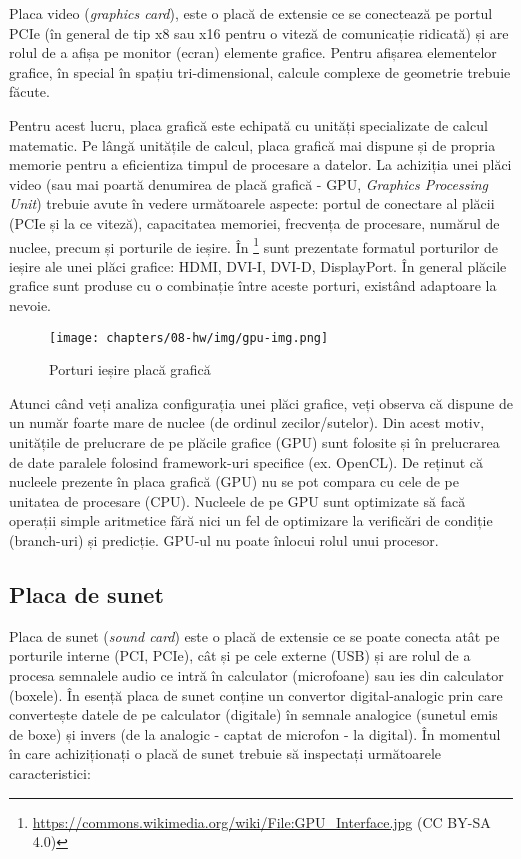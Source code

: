 Placa video (\textit{graphics card}), este o placă de extensie ce se conectează pe portul PCIe (în general de tip x8 sau x16 pentru o viteză de comunicație ridicată) și are rolul de a afișa pe monitor (ecran) elemente grafice.
Pentru afișarea elementelor grafice, în special în spațiu tri-dimensional, calcule complexe de geometrie trebuie făcute.

Pentru acest lucru, placa grafică este echipată cu unități specializate de calcul matematic.
Pe lângă unitățile de calcul, placa grafică mai dispune și de propria memorie pentru a eficientiza timpul de procesare a datelor.
La achiziția unei plăci video (sau mai poartă denumirea de placă grafică - GPU, \textit{Graphics Processing Unit}) trebuie avute în vedere următoarele aspecte: portul de conectare al plăcii (PCIe și la ce viteză), capacitatea memoriei, frecvența de procesare, numărul de nuclee, precum și porturile de ieșire.
În \footnote{\url{https://commons.wikimedia.org/wiki/File:GPU_Interface.jpg} (CC BY-SA 4.0)} sunt prezentate formatul porturilor de ieșire ale unei plăci grafice: HDMI, DVI-I, DVI-D, DisplayPort.
În general plăcile grafice sunt produse cu o combinație între aceste porturi, existând adaptoare la nevoie.

\begin{figure}[!htbp]
  \centering
  \texttt{[image: chapters/08-hw/img/gpu-img.png]}
  \caption{Porturi ieșire placă grafică\protect\footnotemark}
  \label{fig:hw:gpu}
\end{figure}

Atunci când veți analiza configurația unei plăci grafice, veți observa că dispune de un număr foarte mare de nuclee (de ordinul zecilor/sutelor).
Din acest motiv, unitățile de prelucrare de pe plăcile grafice (GPU) sunt folosite și în prelucrarea de date paralele folosind framework-uri specifice (ex. OpenCL).
De reținut că nucleele prezente în placa grafică (GPU) nu se pot compara cu cele de pe unitatea de procesare (CPU).
Nucleele de pe GPU sunt optimizate să facă operații simple aritmetice fără nici un fel de optimizare la verificări de condiție (branch-uri) și predicție.
GPU-ul nu poate înlocui rolul unui procesor.

\subsection{Placa de sunet}
\label{sec:hw:extension:sound}

Placa de sunet (\textit{sound card}) este o placă de extensie ce se poate conecta atât pe porturile interne (PCI, PCIe), cât și pe cele externe (USB) și are rolul de a procesa semnalele audio ce intră în calculator (microfoane) sau ies din calculator (boxele).
În esență placa de sunet conține un convertor digital-analogic prin care convertește datele de pe calculator (digitale) în semnale analogice (sunetul emis de boxe) și invers (de la analogic - captat de microfon - la digital).
În momentul în care achiziționați o placă de sunet trebuie să inspectați următoarele caracteristici:

